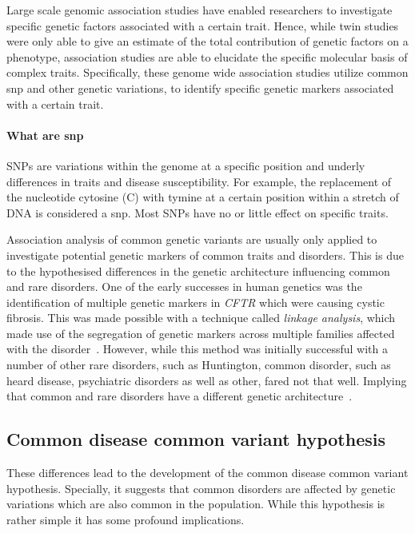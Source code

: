 \documentclass[../header.tex]{subfiles}
\begin{document}
Large scale genomic association studies have enabled researchers to investigate specific genetic factors associated with a certain trait.
Hence, while twin studies were only able to give an estimate of the total contribution of genetic factors on a phenotype, association studies are able to elucidate the specific molecular basis of complex traits.
Specifically, these genome wide association studies utilize common \acrfull{snp} and other genetic variations, to identify specific genetic markers associated with a certain trait.

\paragraph{What are \acrfull{snp}}
\label{par:what_are_snp}
SNPs are variations within the genome at a specific position and underly differences in traits and disease susceptibility. 
For example, the replacement of the nucleotide cytosine (C) with tymine at a certain position within a stretch of DNA is considered a \acrfull{snp}.
Most SNPs have no or little effect on specific traits.

Association analysis of common genetic variants are usually only applied to investigate potential genetic markers of common traits and disorders.
This is due to the hypothesised differences in the genetic architecture influencing common and rare disorders.
One of the early successes in human genetics was the identification of multiple genetic markers in \textit{CFTR} which were causing cystic fibrosis.
This was made possible with a technique called \textit{linkage analysis}, which made use of the segregation of genetic markers across multiple families affected with the disorder~\cite{Kerem1989}.
However, while this method was initially successful with a number of other rare disorders, such as Huntington, common disorder, such as heard disease, psychiatric disorders as well as other, fared not that well.  
Implying that common and rare disorders have a different genetic architecture~\cite{Hirschhorn2005a}.

\subsection{Common disease common variant hypothesis}
\label{sub:common_versus_rare_genetic_variants}

These differences lead to the development of the common disease common variant hypothesis.
Specially, it suggests that common disorders are affected by genetic variations which are also common in the population.
While this hypothesis is rather simple it has some profound implications.
\end{document}
